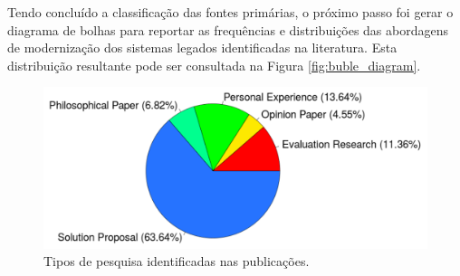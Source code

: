 Tendo concluído a classificação das fontes primárias, o próximo passo foi gerar o diagrama de bolhas para reportar as frequências 
e distribuições das abordagens de modernização dos sistemas legados identificadas na literatura. 
Esta distribuição resultante pode ser consultada na Figura \ref{fig:buble_diagram}. 

%
%
\begin{figure}
\centering
\includegraphics[scale=0.5]{img/mapeamento/research_type.pdf}
\caption{Tipos de pesquisa identificadas nas publicações.}
\label{fig:research_type}
\end{figure}


